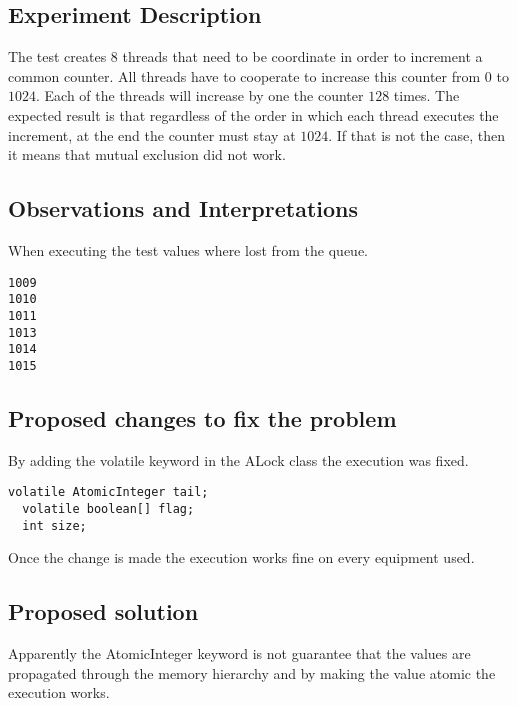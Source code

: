 
\subsection{Experiment Description} 
\par
The test creates $8$ threads that need to be coordinate in order to increment a common counter. All threads have to cooperate to increase this counter from 0 to $1024$. Each of the threads will increase by one the counter $128$ times.
The expected result is that regardless of the order in which each thread executes the increment, at the end the counter must stay at $1024$.
If that is not the case, then it means that mutual exclusion did not work.
\par


\subsection{Observations and Interpretations}

\par
When executing the test values where lost from the queue.
\begin{lstlisting}[frame=single,breaklines=true]
1009
1010
1011
1013
1014
1015
\end{lstlisting}



\subsection{Proposed changes to fix the problem}

\par
By adding the volatile keyword in the ALock class the execution was fixed.
\begin{lstlisting}[frame=single,breaklines=true]
  volatile AtomicInteger tail;
  volatile boolean[] flag;
  int size;
\end{lstlisting}
Once the change is made the execution works fine on every equipment used.



\subsection{Proposed solution}
\par
Apparently the AtomicInteger keyword is not guarantee that the values are propagated through the memory hierarchy and by making the value atomic the execution works.

